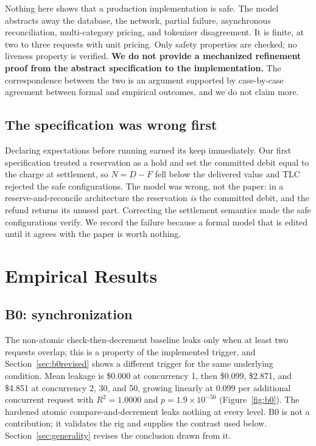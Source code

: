 \documentclass[preprint,3p,authoryear,12pt]{elsarticle}
\begin{document}
Nothing here shows that a production implementation is safe. The model abstracts away
the database, the network, partial failure, asynchronous reconciliation, multi-category
pricing, and tokenizer disagreement. It is finite, at two to three requests with unit
pricing. Only safety properties are checked; no liveness property is verified. \textbf{We
do not provide a mechanized refinement proof from the abstract specification to the
implementation.} The correspondence between the two is an argument supported by
case-by-case agreement between formal and empirical outcomes, and we do not claim more.

\subsection{The specification was wrong first}
Declaring expectations before running earned its keep immediately. Our first
specification treated a reservation as a hold and set the committed debit equal to the
charge at settlement, so $N = D - F$ fell below the delivered value and TLC rejected the
safe configurations. The model was wrong, not the paper: in a reserve-and-reconcile
architecture the reservation \emph{is} the committed debit, and the refund returns its
unused part. Correcting the settlement semantics made the safe configurations verify. We
record the failure because a formal model that is edited until it agrees with the paper
is worth nothing.

\section{Empirical Results}
\label{sec:results}

\subsection{B0: synchronization}
The non-atomic check-then-decrement baseline leaks only when at least two requests
overlap; this is a property of the implemented trigger, and Section~\ref{sec:b0revised}
shows a different trigger for the same underlying condition. Mean leakage is \$0.000 at
concurrency 1, then \$0.099, \$2.871, and \$4.851 at concurrency 2, 30, and 50, growing
linearly at 0.099 per additional concurrent request with $R^2 = 1.0000$ and $p = 1.9
\times 10^{-50}$ (Figure~\ref{fig:b0}). The hardened atomic compare-and-decrement leaks
nothing at every level.
B0 is not a contribution; it validates the rig and supplies the contrast used below.
Section~\ref{sec:generality} revises the conclusion drawn from it.
\end{document}
